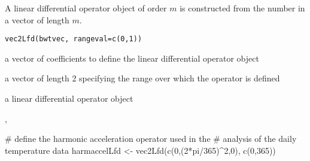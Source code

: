 \begin{Description}\relax
A linear differential operator object of order $m$ is
constructed from the number in a vector of length $m$.
\end{Description}
\begin{Usage}
\begin{verbatim}
vec2Lfd(bwtvec, rangeval=c(0,1))
\end{verbatim}
\end{Usage}
\begin{Arguments}
\begin{ldescription}
\item[\code{bwtvec}] a vector of coefficients to define the linear differential
operator object

\item[\code{rangeval}] a vector of length 2 specifying the range over which the
operator is defined

\end{ldescription}
\end{Arguments}
\begin{Value}
a linear differential operator object
\end{Value}
\begin{SeeAlso}\relax
{}, 
\end{SeeAlso}
\begin{Examples}
\begin{ExampleCode}
#  define the harmonic acceleration operator used in the
#  analysis of the daily temperature data
harmaccelLfd <- vec2Lfd(c(0,(2*pi/365)^2,0), c(0,365))
\end{ExampleCode}
\end{Examples}

